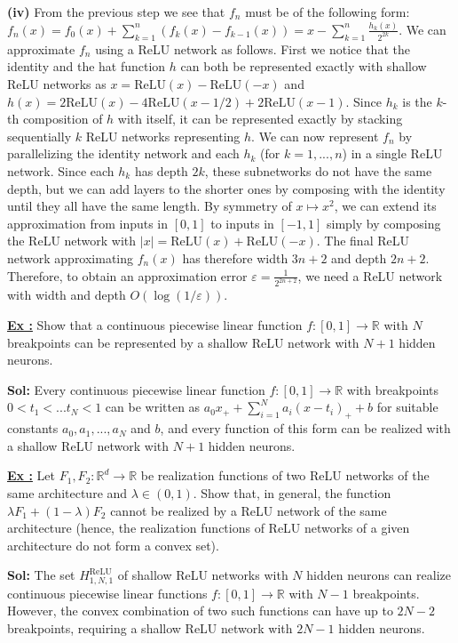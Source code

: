 \documentclass[a4paper,10pt]{article}
\newcounter{exerciseCounter}
\newcommand{\exercise}[1]{%
    \vspace{1mm}
    \stepcounter{exerciseCounter}%
    \color{exerciseBlack}
    \textbf{\underline{Ex \theexerciseCounter:}} #1
}
\newcommand{\solution}[1]{%
    {\color{solutionGray} \textbf{Sol: } #1} %
}
\begin{document}
\begin{scriptsize}
{\textbf{(iv)} From the previous step we see that $f_n$ must be of the following form:
$f_n(x) = f_0(x) + \sum_{k=1}^n (f_k(x)-f_{k-1}(x)) = x - \sum_{k=1}^n \frac{h_k(x)}{2^{2k}}$.
We can approximate $f_n$ using a ReLU network as follows.
First we notice that the identity and the hat function $h$ can both be represented exactly with shallow ReLU networks as $x = \text{ReLU}(x) - \text{ReLU}(-x)$ and $h(x) = 2\text{ReLU}(x) - 4\text{ReLU}(x-1/2) + 2\text{ReLU}(x-1)$.
Since $h_k$ is the $k$-th composition of $h$ with itself, it can be represented exactly by stacking sequentially $k$ ReLU networks representing $h$.
We can now represent $f_n$ by parallelizing the identity network and each $h_k$ (for $k=1,...,n$) \color{solutionGray} in a single ReLU network. Since each $h_k$ has depth $2k$, these subnetworks do not have the same depth, but we can add layers to the shorter ones by composing with the identity until they all have the same length.
By symmetry of $x \mapsto x^2$, we can extend its approximation from inputs in $[0,1]$ to inputs in $[-1,1]$ simply by composing the ReLU network with $|x| = \text{ReLU}(x) + \text{ReLU}(-x)$.
The final ReLU network approximating $f_n(x)$ has therefore width $3n+2$ and depth $2n+2$.
Therefore, to obtain an approximation error $\varepsilon = \frac{1}{2^{2n+2}}$, we need a ReLU network with width and depth $O(\log(1/\varepsilon))$.}

\exercise{Show that a continuous piecewise linear function $f: [0,1] \to \mathbb{R}$ with $N$ breakpoints can be represented by a shallow ReLU network with $N+1$ hidden neurons.}
\solution{Every continuous piecewise linear function $f: [0,1] \to \mathbb{R}$ with breakpoints $0 < t_1 < ... t_N < 1$ can be written as
$a_0x_+ + \sum_{i=1}^N a_i(x-t_i)_+ + b$
for suitable constants $a_0,a_1,...,a_N$ and $b$, and every function of this form can be realized with a shallow ReLU network with $N+1$ hidden neurons.}

\exercise{Let $F_1, F_2 : \mathbb{R}^d \to \mathbb{R}$ be realization functions of two ReLU networks of the same architecture and $\lambda \in (0, 1)$. Show that, in general, the function $\lambda F_1 + (1 - \lambda) F_2$ cannot be realized by a ReLU network of the same architecture (hence, the realization functions of ReLU networks of a given architecture do not form a convex set).}
\solution{The set $H^\text{ReLU}_{1,N,1}$ of shallow ReLU networks with $N$ hidden neurons can realize continuous piecewise linear functions $f : [0, 1] \to \mathbb{R}$ with $N - 1$ breakpoints. However, the convex combination of two such functions can have up to $2N - 2$ breakpoints, requiring a shallow ReLU network with $2N - 1$ hidden neurons.}


\end{scriptsize}
\end{document}
